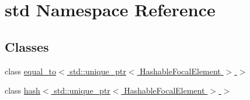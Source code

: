\hypertarget{namespacestd}{}\section{std Namespace Reference}
\label{namespacestd}
\subsection*{Classes}
\begin{DoxyCompactItemize}
\item 
class \hyperlink{classstd_1_1equal__to_3_01std_1_1unique__ptr_3_01HashableFocalElement_01_4_01_4}{equal\+\_\+to$<$ std\+::unique\+\_\+ptr$<$ Hashable\+Focal\+Element $>$ $>$}
\item 
class \hyperlink{classstd_1_1hash_3_01std_1_1unique__ptr_3_01HashableFocalElement_01_4_01_4}{hash$<$ std\+::unique\+\_\+ptr$<$ Hashable\+Focal\+Element $>$ $>$}
\end{DoxyCompactItemize}
